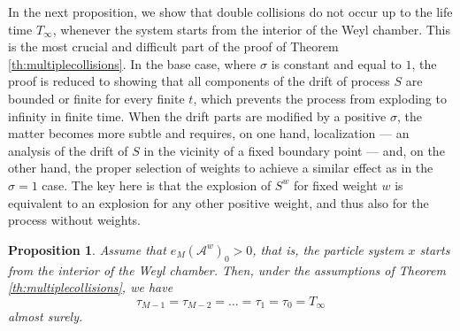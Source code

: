 \documentclass{article}
\numberwithin{equation}{section}
\newcommand{\Aa}{\mathcal{A}^{w}}
\newcommand{\eA}[1]{e_{#1}(\Aa)}
\newcommand{\lifetime}{T_\infty}
\theoremstyle{plain}
\newtheorem{proposition}{Proposition}
\begin{document}
In the next proposition, we show that double collisions do not occur up to the life time $\lifetime $, whenever the system starts from the interior of the Weyl chamber. This is the most crucial and difficult part of the proof of Theorem \ref{th:multiplecollisions}. In the base case, where $\sigma$ is constant and equal to $1$, the proof is reduced to showing that all components of the drift of process $S$ are bounded or finite for every finite $t$, which prevents the process from exploding to infinity in finite time. When the drift parts are modified by a positive $\sigma$, the matter becomes more subtle and requires, on one hand, localization — an analysis of the drift of $S$ in the vicinity of a fixed boundary point — and, on the other hand, the proper selection of weights to achieve a similar effect as in the $\sigma = 1$ case. The key here is that the explosion of $S^w$ for fixed weight $w$ is equivalent to an explosion for any other positive weight, and thus also for the process without weights.


\begin{proposition}
    Assume that $\eA{M}_0>0$, that is, the particle system $x$ starts from the interior of the Weyl chamber. Then, under the assumptions of Theorem \ref{th:multiplecollisions}, we have
    \begin{equation*}
        \tau_{M-1} = \tau_{M-2} = \ldots = \tau_1 = \tau_0= \lifetime
    \end{equation*}
    almost surely.
\end{proposition}
\end{document}
